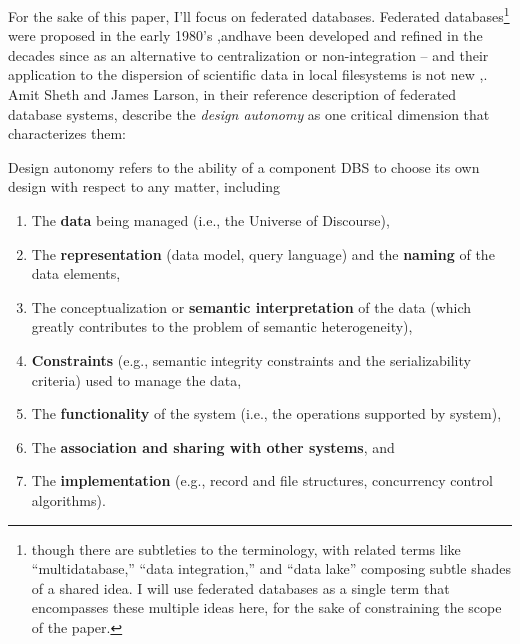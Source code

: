 \documentclass{article}
\begin{document}
For the sake of this paper, I'll focus on federated databases. Federated
databases\footnote{though there are subtleties to the terminology, with
  related terms like ``multidatabase,'' ``data integration,'' and ``data
  lake'' composing subtle shades of a shared idea. I will use federated
  databases as a single term that encompasses these multiple ideas here,
  for the sake of constraining the scope of the paper.} were proposed in
the early 1980's \cite{heimbignerFederatedArchitectureInformation1985},andhave been
developed and refined in the decades since as an alternative to
centralization or non-integration \cite{
litwinInteroperabilityMultipleAutonomous1990,
kashyapSemanticSchematicSimilarities1996,
hullManagingSemanticHeterogeneity1997} -- and their application to
the dispersion of scientific data in local filesystems is not new \cite{busseFederatedInformationSystems1999},.
Amit Sheth and James Larson, in their reference description of federated
database systems, describe the \emph{design autonomy} as one critical
dimension that characterizes them:

\begin{leftbar}
Design autonomy refers to the ability of a component DBS to choose its
own design with respect to any matter, including

\begin{enumerate}
\def\labelenumi{(\alph{enumi})}

\item
  The \textbf{data} being managed (i.e., the Universe of Discourse),
\item
  The \textbf{representation} (data model, query language) and the
  \textbf{naming} of the data elements,
\item
  The conceptualization or \textbf{semantic interpretation} of the data
  (which greatly contributes to the problem of semantic heterogeneity),
\item
  \textbf{Constraints} (e.g., semantic integrity constraints and the
  serializability criteria) used to manage the data,
\item
  The \textbf{functionality} of the system (i.e., the operations
  supported by system),
\item
  The \textbf{association and sharing with other systems}, and
\item
  The \textbf{implementation} (e.g., record and file structures,
  concurrency control algorithms).
\end{enumerate}
\end{leftbar}
\end{document}
